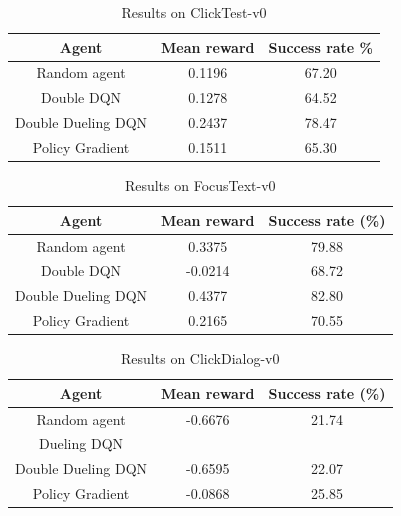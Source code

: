 \documentclass[10pt,journal,compsoc]{IEEEtran}
\begin{document}
\begin{table}[!t]
\renewcommand{\arraystretch}{1.3}
\caption{Results on ClickTest-v0}
\label{results-clicktest}
\centering
\begin{tabular}{|c||c|c|}
\hline
Agent & Mean reward & Success rate \% \\
\hline
Random agent & 0.1196 & 67.20\\
\hline
Double DQN & 0.1278 & 64.52\\
\hline
Double Dueling DQN & 0.2437 & 78.47\\

\hline
Policy Gradient & 0.1511 & 65.30\\
\hline
\end{tabular}
\end{table}

\begin{table}[!t]
\renewcommand{\arraystretch}{1.3}
\caption{Results on FocusText-v0}
\label{results-focustext}
\centering
\begin{tabular}{|c||c|c|}
\hline
Agent & Mean reward & Success rate (\%) \\
\hline
Random agent & 0.3375 & 79.88\\
\hline
Double DQN & -0.0214 & 68.72\\
\hline
Double Dueling DQN & 0.4377 & 82.80 \\
\hline
Policy Gradient &  0.2165 & 70.55\\
\hline
\end{tabular}
\end{table}


\begin{table}[!t]
\renewcommand{\arraystretch}{1.3}
\caption{Results on ClickDialog-v0}
\label{results-closedialog}
\centering
\begin{tabular}{|c||c|c|}
\hline
Agent & Mean reward & Success rate (\%) \\
\hline
Random agent & -0.6676 & 21.74 \\
\hline
Dueling DQN & &\\
\hline
Double Dueling DQN & -0.6595 & 22.07\\
\hline
Policy Gradient & -0.0868 & 25.85\\
\hline
\end{tabular}
\end{table}
\end{document}
